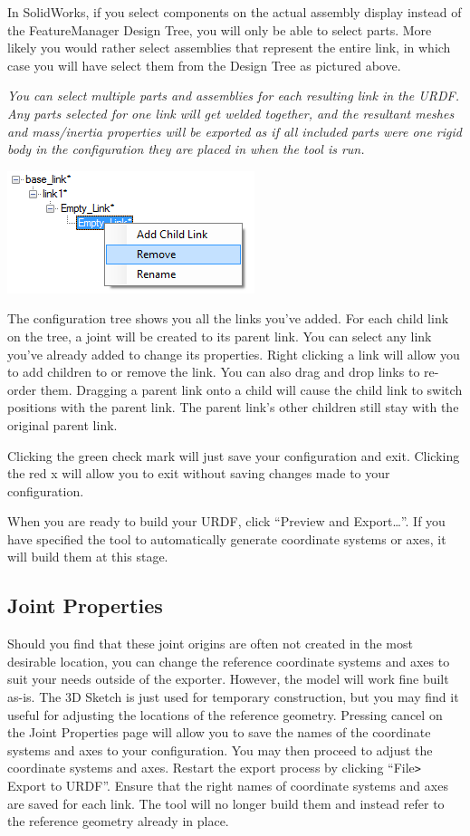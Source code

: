 In SolidWorks, if you select components on the actual assembly display instead of the FeatureManager Design Tree, you will only be able to select parts. More likely you would rather select assemblies that represent the entire link, in which case you will have select them from the Design Tree as pictured above. 

\emph{You can select multiple parts and assemblies for each resulting link in the URDF.  Any parts selected for one link will get welded together, and the resultant meshes and mass/inertia properties will be exported as if all included parts were one rigid body in the configuration they are placed in when the tool is run.}

\includegraphics{images/ExportConfigTree}

The configuration tree shows you all the links you've added. For each child link on the tree, a joint will be created to its parent link. You can select any link you've already added to change its properties. Right clicking a link will allow you to add children to or remove the link. You can also drag and drop links to re-order them. Dragging a parent link onto a child will cause the child link to switch positions with the parent link. The parent link's other children still stay with the original parent link. 

Clicking the green check mark will just save your configuration and exit. Clicking the red x will allow you to exit without saving changes made to your configuration. 

When you are ready to build your URDF, click ``Preview and Export\ldots''. If you have specified the tool to automatically generate coordinate systems or axes, it will build them at this stage. 

\subsection{Joint Properties}
\indent Should you find that these joint origins are often not created in the most desirable location, you can change the reference coordinate systems and axes to suit your needs outside of the exporter. However, the model will work fine built as-is. The 3D Sketch is just used for temporary construction, but you may find it useful for adjusting the locations of the reference geometry. Pressing cancel on the Joint Properties page will allow you to save the names of the coordinate systems and axes to your configuration. You may then proceed to adjust the coordinate systems and axes. Restart the export process by clicking ``File\verb|>| Export to URDF''. Ensure that the right names of coordinate systems and axes are saved for each link. The tool will no longer build them and instead refer to the reference geometry already in place. 

